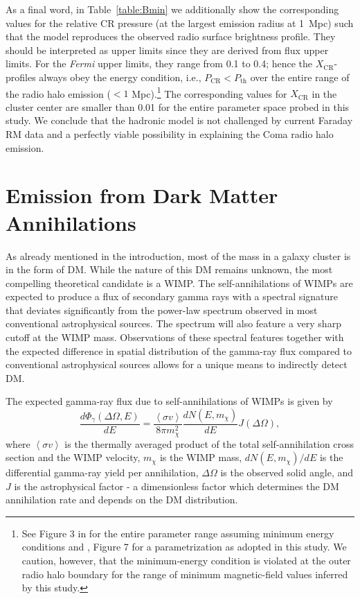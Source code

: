 \documentclass[12pt,manuscript]{aastex}
\newcommand{\expval}[1]{\left\langle #1 \right\rangle}
\newcommand{\CR}{\mathrm{CR}}
\begin{document}
As a final word, in Table~\ref{table:Bmin} we additionally show the corresponding values for the
relative CR pressure (at the largest emission radius at 1~Mpc) such that the model reproduces the
observed radio surface brightness profile. They should be interpreted as upper limits since they
are derived from flux upper limits. For the {\em Fermi} upper limits, they range from 0.1 to 0.4;
hence the $X_{\CR}$-profiles always obey the energy condition, i.e., $P_{\CR} < P_{\mathrm{th}}$
over the entire range of the radio halo emission ($< 1$ Mpc).\footnote{See Figure 3 in
\citet{article:PfrommerEnsslin:2004a} for the entire parameter range assuming minimum energy
conditions and \citet{article:PfrommerEnsslin:2004b}, Figure 7 for a parametrization as adopted in
this study.  We caution, however, that the minimum-energy condition is violated at the outer radio
halo boundary for the range of minimum magnetic-field values inferred by this study.} The
corresponding values for $X_\CR$ in the cluster center are smaller than 0.01 for the entire
parameter space probed in this study. We conclude that the hadronic model is not challenged by
current Faraday RM data and a perfectly viable possibility in explaining the Coma radio halo
emission.

%
%

\section{Emission from Dark Matter Annihilations}
As already mentioned in the introduction, most of the mass in a galaxy cluster is in the form of
DM. While the nature of this DM remains unknown, the most compelling theoretical candidate is a
WIMP. The self-annihilations of WIMPs are expected to produce a flux of secondary gamma rays with a
spectral signature that deviates significantly from the power-law spectrum observed in most
conventional astrophysical sources. The spectrum will also feature a very sharp cutoff at the WIMP
mass. Observations of these spectral features together with the expected difference in spatial
distribution of the gamma-ray flux compared to conventional astrophysical sources allows for a
unique means to indirectly detect DM.

The expected gamma-ray flux due to self-annihilations of WIMPs is given by 
\begin{equation}
\frac{d\Phi_{\gamma}(\Delta\Omega,E)}{dE}=
\frac{\expval{\sigma v}}{8\pi m_{\chi}^{2}}\frac{dN(E,m_{\chi})}{dE} J(\Delta\Omega),
\label{eqn:WIMPflux}
\end{equation}
where $\expval{\sigma v}$ is the thermally averaged product of the total self-annihilation cross
section and the WIMP velocity, $m_{\chi}$ is the WIMP mass, $dN(E,m_{\chi})/dE$ is the differential
gamma-ray yield per annihilation, $\Delta\Omega$ is the observed solid angle, and $J$ is the
astrophysical factor - a dimensionless factor which determines the DM annihilation rate and depends
on the DM distribution.
\end{document}

